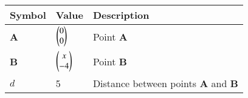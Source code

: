 \begin{tabular}{|m{5em} | m{5em} | m{10em} |}
	\hline
	\textbf{Symbol} & \textbf{Value} &\textbf{Description}\\
	\hline
		\textbf{A} & $\begin{pmatrix}0\\0\end{pmatrix}$ & Point \textbf{A}\\
	\hline
		\textbf{B} & $\begin{pmatrix}x\\-4\end{pmatrix}$ & Point \textbf{B}\\
	\hline
		$d$          & 5              & Distance between points \textbf{A} and \textbf{B}\\
	\hline
\end{tabular}
